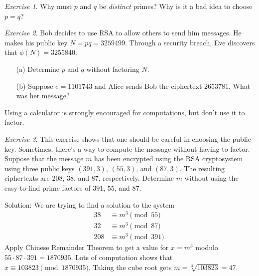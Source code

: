 \documentclass{article}
\theoremstyle{definition}
\theoremstyle{remark}
\newtheorem{exercise}{Exercise}
\begin{document}
    \begin{exercise}
        Why must \(p\) and \(q\) be \textit{distinct} primes?
        Why is it a bad idea to choose \(p=q\)?
    \end{exercise}
    \iffalse
    Solution:
    There are a few reasons, but the most clear one is that \(p\) is easy to recover by computing \(\sqrt{N}\).
    \(\sqrt{N}=\sqrt{pq}\) is an integer if and only if \(p=q\).
    \fi

    \begin{exercise}
        Bob decides to use RSA to allow others to send him messages.
        He makes his public key \(N=pq=3259499\).
        Through a security breach, Eve discovers that \(\phi(N)=3255840\).
        \begin{enumerate}
            \item[(a)] Determine \(p\) and \(q\) without factoring \(N\).
            \item[(b)] Suppose \(e=1101743\) and Alice sends Bob the ciphertext \(2653781\).
            What was her message? 
        \end{enumerate}
        Using a calculator is strongly encouraged for computations, but don't use it to factor.
    \end{exercise}
    \iffalse
    Solution:
    \begin{enumerate}
        \item[(a)] \((p-1)(q-1)=N-(p+q)+1\).
        From this, obtain \(p+q\) and then solve the quadratic \((X-p)(X-q)=X^2-(p+q)X+pq\) using the quadratic formula.
        You should get \(p=1531\) and \(q=2129\) (up to reordering of \(p\) and \(q\)).
        \item[(b)] Use the reverse Euclidean algorithm to get \(d\) and then compute \(m\) using \(c^d\pmod{N}\).
        I don't have the numerical answer, but these computations will work.
    \end{enumerate}
    \fi

    \begin{exercise}
        This exercise shows that one should be careful in choosing the public key.
        Sometimes, there's a way to compute the message without having to factor.
        Suppose that the message \(m\) has been encrypted using the RSA cryptosystem using three public keys \((391,3)\), \((55,3)\), and \((87,3)\).
        The resulting ciphertexts are \(208\), \(38\), and \(87\), respectively.
        Determine \(m\) without using the easy-to-find prime factors of \(391\), \(55\), and \(87\).
    \end{exercise}
    \iffalse
    Solution:
    We are trying to find a solution to the system
    \begin{align*}
        38 &\equiv m^3 \pmod{55}\\
        32 &\equiv m^3 \pmod{87}\\
        208 &\equiv m^3 \pmod{391}.
    \end{align*}
    Apply Chinese Remainder Theorem to get a value for \(x = m^3\) modulo \(55\cdot 87\cdot 391 = 1870935\).
    Lots of computation shows that \(x \equiv 103823\pmod{1870935}\).
    Taking the cube root gets \(m = \sqrt[3]{103823} = 47\).
\end{document}
